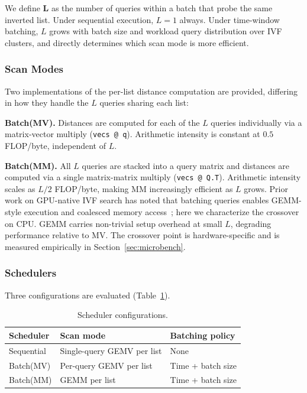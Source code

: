 \documentclass[sigconf, nonacm]{acmart}
\begin{document}
We define \textbf{L} as the number of queries within a batch that probe
the same inverted list. Under sequential execution, $L = 1$ always.
Under time-window batching, $L$ grows with batch size and workload
query distribution over IVF clusters, and directly determines which scan
mode is more efficient.

\subsubsection{Scan Modes}

Two implementations of the per-list distance computation are provided,
differing in how they handle the $L$ queries sharing each list:

\textbf{Batch(MV).} Distances are computed for each of the $L$ queries
individually via a matrix-vector multiply (\texttt{vecs @ q}). Arithmetic
intensity is constant at $0.5$ FLOP/byte, independent of $L$.

\textbf{Batch(MM).} All $L$ queries are stacked into a query matrix and
distances are computed via a single matrix-matrix multiply
(\texttt{vecs @ Q.T}). Arithmetic intensity scales as $L/2$ FLOP/byte,
making MM increasingly efficient as $L$ grows. Prior work on GPU-native
IVF search has noted that batching queries enables GEMM-style execution
and coalesced memory access~\cite{ivfrabitq2025}; here we characterize
the crossover on CPU. GEMM carries non-trivial setup overhead at small
$L$, degrading performance relative to MV. The crossover point is
hardware-specific and is measured empirically in
Section~\ref{sec:microbench}.

\subsubsection{Schedulers}

Three configurations are evaluated (Table~\ref{tab:schedulers}).

\begin{table}
  \caption{Scheduler configurations.}
  \label{tab:schedulers}
  \begin{tabular}{lll}
    \toprule
    Scheduler  & Scan mode               & Batching policy \\
    \midrule
    Sequential & Single-query GEMV per list & None \\
    Batch(MV)  & Per-query GEMV per list & Time + batch size \\
    Batch(MM)  & GEMM per list           & Time + batch size \\
    \bottomrule
  \end{tabular}
\end{table}
\end{document}
